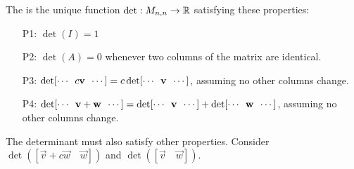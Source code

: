 \begin{applicationActivities}
\begin{definition}
The  is the unique function
\(\det:M_{n,n}\to\IR\) satisfying these  properties:
\begin{enumerate}
\item [P1:] $\det(I)=1$
\item [P2:] $\det(A)=0$ whenever two columns of the matrix are identical.
\item[P3:]
\(\det[\cdots\hspace{0.5em}c\vec{v}\hspace{0.5em}\cdots]=
c\det[\cdots\hspace{0.5em}\vec{v}\hspace{0.5em}\cdots]\), assuming no other columns change.
\item[P4:]
\(\det[\cdots\hspace{0.5em}\vec{v}+\vec{w}\hspace{0.5em}\cdots]=
\det[\cdots\hspace{0.5em}\vec{v}\hspace{0.5em}\cdots]+
\det[\cdots\hspace{0.5em}\vec{w}\hspace{0.5em}\cdots]\), assuming no other columns change.
\end{enumerate}
\end{definition}

%

\begin{observation}
The determinant must also satisfy other properties.
Consider \(\det([\vec v+c\vec w\hspace{1em}\vec w])\) and
\(\det([\vec v\hspace{1em}\vec w])\).


\end{observation}
\end{applicationActivities}
